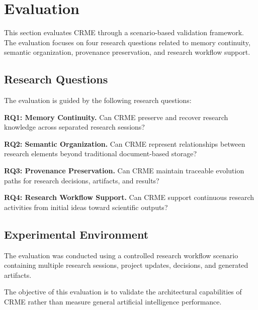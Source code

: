 \section{Evaluation}
\label{sec:evaluation}


This section evaluates CRME through a scenario-based validation
framework. The evaluation focuses on four research questions related
to memory continuity, semantic organization, provenance preservation,
and research workflow support.



\subsection{Research Questions}


The evaluation is guided by the following research questions:


\textbf{RQ1: Memory Continuity.}
Can CRME preserve and recover research knowledge across separated
research sessions?


\textbf{RQ2: Semantic Organization.}
Can CRME represent relationships between research elements beyond
traditional document-based storage?


\textbf{RQ3: Provenance Preservation.}
Can CRME maintain traceable evolution paths for research decisions,
artifacts, and results?


\textbf{RQ4: Research Workflow Support.}
Can CRME support continuous research activities from initial ideas
toward scientific outputs?



\subsection{Experimental Environment}


The evaluation was conducted using a controlled research workflow
scenario containing multiple research sessions, project updates,
decisions, and generated artifacts.

The objective of this evaluation is to validate the architectural
capabilities of CRME rather than measure general artificial intelligence
performance.


